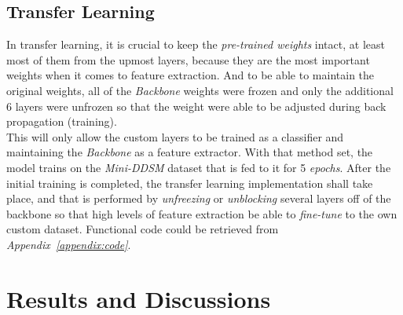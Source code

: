\documentclass[12pt]{extarticle}
\begin{document}
	\subsection{Transfer Learning}
	In transfer learning, it is crucial to keep the \emph{pre-trained weights} intact, at least most of them from the upmost layers, because they are the most important weights when it comes to feature extraction. And to be able to maintain the original weights, all of the \emph{Backbone} weights were frozen and only the additional 6 layers were unfrozen so that the weight were able to be adjusted during back propagation (training).\\
	This will only allow the custom layers to be trained as a classifier and maintaining the \emph{Backbone} as a feature extractor. With that method set, the model trains on the \emph{Mini-DDSM} dataset that is fed to it for 5 \emph{epochs}. After the initial training is completed, the transfer learning implementation shall take place, and that is performed by \emph{unfreezing} or \emph{unblocking} several layers off of the backbone so that high levels of feature extraction be able to \emph{fine-tune} to the own custom dataset. Functional code could be retrieved from \emph{Appendix~\ref{appendix:code}}.
	

	\newpage
	
	\section{Results and Discussions}
\end{document}
